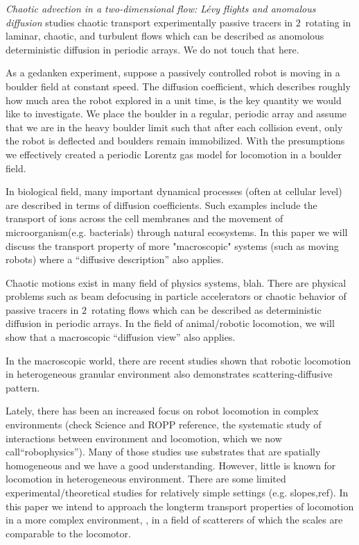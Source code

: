                                                             \toCB
{} {\em Chaotic advection in a two-dimensional
flow: L\'evy flights and anomalous diffusion} studies chaotic transport
experimentally passive tracers in $2$\dmn\ rotating in laminar, chaotic,
and turbulent flows which can be described as anomolous deterministic
diffusion in periodic arrays. We do not touch that here.


%
%

As a gedanken experiment, suppose a passively controlled robot is moving
in a boulder field at constant speed. The diffusion coefficient, which
describes roughly how much area the robot explored in a unit time, is the
key quantity we would like to investigate. We place the boulder in a
regular, periodic array and assume that we are in the heavy boulder limit
such that after each collision event, only the robot is deflected and
boulders remain immobilized. With the presumptions we effectively created
a periodic Lorentz gas model for locomotion in a boulder
field.

In biological field,  many important dynamical processes (often at
cellular level) are described in  terms of diffusion coefficients. Such
examples include the transport of ions  across the cell
membranes and the movement of  microorganism(e.g.
bacterials) through natural  ecosystems. In this
paper we will discuss the transport  property of more "macroscopic"
systems (such as moving  robots) where a ``diffusive
description'' also applies.

Chaotic motions exist in many field of physics systems, blah. There are
physical problems such as beam defocusing in particle accelerators or
chaotic behavior of passive tracers in $2$\dmn\ rotating flows which can
be described as deterministic diffusion in periodic arrays. In the field
of animal/robotic locomotion, we will show that a macroscopic ``diffusion
view'' also applies.

In the macroscopic world, there are recent
studies shown that robotic locomotion in heterogeneous granular
environment also demonstrates scattering-diffusive pattern.

Lately, there has been an increased focus on robot locomotion in complex
environments (check Science and ROPP reference, the systematic study of
interactions between environment and locomotion, which we now
call``robophysics''). Many of those studies use substrates that are
spatially homogeneous and we have a good
understanding. However, little is
known for locomotion in heterogeneous environment. There are some limited
experimental/theoretical studies for relatively simple settings (e.g.
slopes,ref). In this paper we intend to approach the longterm transport
properties of locomotion in a more complex environment, \ie, in a field
of scatterers of which the scales are comparable to the locomotor.


